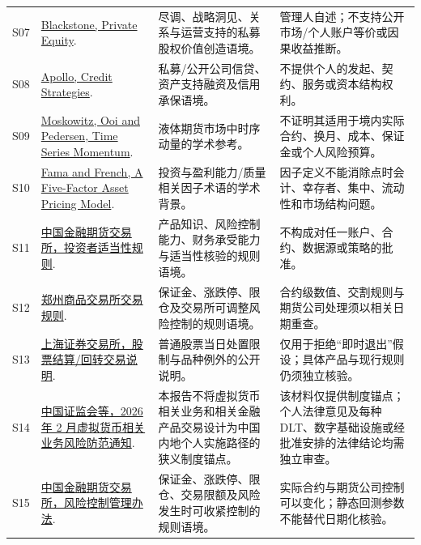 \begin{longtable}{L{0.85cm} L{4.0cm} L{4.1cm} L{4.35cm}}
S07 & \href{https://www.blackstone.com/our-businesses/private-equity/}{Blackstone, Private Equity}. & 尽调、战略洞见、关系与运营支持的私募股权价值创造语境。 & 管理人自述；不支持公开市场/个人账户等价或因果收益推断。 \\
S08 & \href{https://www.apollo.com/institutional/strategies/asset-management/credit}{Apollo, Credit Strategies}. & 私募/公开公司信贷、资产支持融资及信用承保语境。 & 不提供个人的发起、契约、服务或资本结构权利。 \\
S09 & \href{https://doi.org/10.1016/j.jfineco.2011.11.003}{Moskowitz, Ooi and Pedersen, Time Series Momentum}. & 液体期货市场中时序动量的学术参考。 & 不证明其适用于境内实际合约、换月、成本、保证金或个人风险预算。 \\
S10 & \href{https://doi.org/10.1016/j.jfineco.2014.10.010}{Fama and French, A Five-Factor Asset Pricing Model}. & 投资与盈利能力/质量相关因子术语的学术背景。 & 因子定义不能消除点时会计、幸存者、集中、流动性和市场结构问题。 \\
S11 & \href{https://www.cffex.com.cn/u/cms/www/202003/271635174xwg.pdf}{中国金融期货交易所，投资者适当性规则}. & 产品知识、风险控制能力、财务承受能力与适当性核验的规则语境。 & 不构成对任一账户、合约、数据源或策略的批准。 \\
S12 & \href{https://www.czce.com.cn/cn/uploadfile/2021/03/01/20210301134917265.pdf}{郑州商品交易所交易规则}. & 保证金、涨跌停、限仓及交易所可调整风险控制的规则语境。 & 合约级数值、交割规则与期货公司处理须以相关日期重查。 \\
S13 & \href{https://www.sse.com.cn/aboutus/mediacenter/hotandd/c/c_20150912_3988692.shtml}{上海证券交易所，股票结算/回转交易说明}. & 普通股票当日处置限制与品种例外的公开说明。 & 仅用于拒绝“即时退出”假设；具体产品与现行规则仍须独立核验。 \\
S14 & \href{https://www.csrc.gov.cn/csrc/c100028/c7614318/content.shtml?f_link_type=f_linkinlinenote}{中国证监会等，2026 年 2 月虚拟货币相关业务风险防范通知}. & 本报告不将虚拟货币相关业务和相关金融产品交易设计为中国内地个人实施路径的狭义制度锚点。 & 该材料仅提供制度锚点；个人法律意见及每种 DLT、数字基础设施或经批准安排的法律结论均需独立审查。 \\
S15 & \href{https://www.cffex.com.cn/cn/ssxz/20230414/43079.html}{中国金融期货交易所，风险控制管理办法}. & 保证金、涨跌停、限仓、交易限额及风险发生时可收紧控制的规则语境。 & 实际合约与期货公司控制可以变化；静态回测参数不能替代日期化核验。 \\
\bottomrule
\end{longtable}

